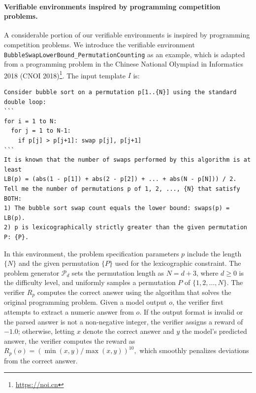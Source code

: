 \documentclass{article}
\theoremstyle{plain}
\theoremstyle{definition}
\theoremstyle{remark}
\begin{document}
\paragraph{Verifiable environments inspired by programming competition problems.}
A considerable portion of our verifiable environments is inspired by programming competition problems.
We introduce the verifiable environment \texttt{BubbleSwapLowerBound\_PermutationCounting} as an example, which is adapted from a programming problem in the Chinese National Olympiad in Informatics 2018 (CNOI 2018)\footnote{\url{https://noi.cn}}.
The input template $I$ is:
\begin{lstlisting}[language={},caption={},label={}]
Consider bubble sort on a permutation p[1..{N}] using the standard double loop:
```
for i = 1 to N:
  for j = 1 to N-1:
    if p[j] > p[j+1]: swap p[j], p[j+1]
```
It is known that the number of swaps performed by this algorithm is at least
LB(p) = (abs(1 - p[1]) + abs(2 - p[2]) + ... + abs(N - p[N])) / 2.
Tell me the number of permutations p of 1, 2, ..., {N} that satisfy BOTH:
1) The bubble sort swap count equals the lower bound: swaps(p) = LB(p).
2) p is lexicographically strictly greater than the given permutation P: {P}.
\end{lstlisting}
In this environment, the problem specification parameters $p$ include the length $\textit{\{N\}}$ and the given permutation $\textit{\{P\}}$ used for the lexicographic constraint.
The problem generator $\mathcal{P}_d$ sets the permutation length as $N = d + 3$, where $d\geq 0$ is the difficulty level, and uniformly samples a permutation $P$ of $\{1, 2, \dots, N\}$.
The verifier $R_{p}$ computes the correct answer using the algorithm that solves the original programming problem.
Given a model output $o$, the verifier first attempts to extract a numeric answer from $o$.
If the output format is invalid or the parsed answer is not a non-negative integer, the verifier assigns a reward of $-1.0$;
otherwise, letting $x$ denote the correct answer and $y$ the model’s predicted answer, the verifier computes the reward as $R_{p}(o) = (\min(x, y)/\max(x, y))^{10},$
which smoothly penalizes deviations from the correct answer.
\end{document}
